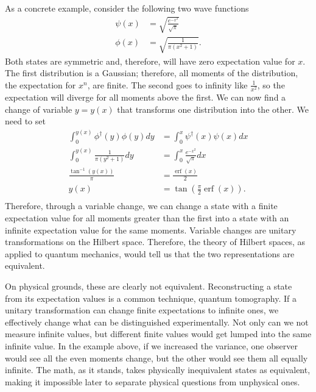 \documentclass[10pt,twocolumn, nofootinbib]{revtex4-2}
\DeclareMathOperator{\erf}{erf}
\begin{document}
As a concrete example, consider the following two wave functions
\begin{align}
\psi(x) &= \sqrt{\frac{e^{-x^2}}{\sqrt{\pi}}} \\
\phi(x) &= \sqrt{\frac{1}{\pi(x^2 + 1)}}.
\end{align}
Both states are symmetric and, therefore, will have zero expectation value for $x$. The first distribution is a Gaussian; therefore, all moments of the distribution, the expectation for $x^n$, are finite. The second goes to infinity like $\frac{1}{x^2}$, so the expectation will diverge for all moments above the first. We can now find a change of variable $y=y(x)$ that transforms one distribution into the other. We need to set
\begin{equation}
\begin{aligned}
\int_{0}^{y(x)} \phi^\dagger(y) \phi(y) dy &= \int_{0}^{x} \psi^\dagger(x) \psi(x) dx \\
\int_{0}^{y(x)} \frac{1}{\pi(y^2 + 1)} dy &= \int_{0}^{x} \frac{e^{-x^2}}{\sqrt{\pi}} dx \\
\frac{\tan^{-1}(y(x))}{\pi} &= \frac{\erf(x)}{2} \\
y(x) &= \tan \left(\frac{\pi}{2}\erf(x)\right). \\
\end{aligned}
\end{equation}
Therefore, through a variable change, we can change a state with a finite expectation value for all moments greater than the first into a state with an infinite expectation value for the same moments. Variable changes are unitary transformations on the Hilbert space. %
Therefore, the theory of Hilbert spaces, as applied to quantum mechanics, would tell us that the two representations are equivalent.

On physical grounds, these are clearly not equivalent. Reconstructing a state from its expectation values is a common technique, quantum tomography. If a unitary transformation can change finite expectations to infinite ones, we effectively change what can be distinguished experimentally. Not only can we not measure infinite values, but different finite values would get lumped into the same infinite value. %
In the example above, if we increased the variance, one observer would see all the even moments change, but the other would see them all equally infinite. The math, as it stands, takes physically inequivalent states as equivalent, making it impossible later to separate physical questions from unphysical ones.
\end{document}
